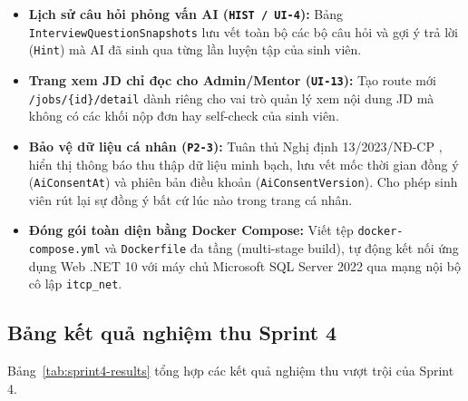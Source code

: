 \begin{itemize}
    \item \textbf{Lịch sử câu hỏi phỏng vấn AI (\texttt{HIST / UI-4}):} Bảng \texttt{InterviewQuestionSnapshots} lưu vết toàn bộ các bộ câu hỏi và gợi ý trả lời (\texttt{Hint}) mà AI đã sinh qua từng lần luyện tập của sinh viên.
    \item \textbf{Trang xem JD chỉ đọc cho Admin/Mentor (\texttt{UI-13}):} Tạo route mới \texttt{/jobs/\{id\}/detail} dành riêng cho vai trò quản lý xem nội dung JD mà không có các khối nộp đơn hay self-check của sinh viên.
    \item \textbf{Bảo vệ dữ liệu cá nhân (\texttt{P2-3}):} Tuân thủ Nghị định 13/2023/NĐ-CP \cite{decree13}, hiển thị thông báo thu thập dữ liệu minh bạch, lưu vết mốc thời gian đồng ý (\texttt{AiConsentAt}) và phiên bản điều khoản (\texttt{AiConsentVersion}). Cho phép sinh viên rút lại sự đồng ý bất cứ lúc nào trong trang cá nhân.
    \item \textbf{Đóng gói toàn diện bằng Docker Compose:} Viết tệp \texttt{docker-compose.yml} và \texttt{Dockerfile} đa tầng (multi-stage build), tự động kết nối ứng dụng Web .NET 10 với máy chủ Microsoft SQL Server 2022 qua mạng nội bộ cô lập \texttt{itcp\_net}.
\end{itemize}

\subsection{Bảng kết quả nghiệm thu Sprint 4}
Bảng~\ref{tab:sprint4-results} tổng hợp các kết quả nghiệm thu vượt trội của Sprint 4.

